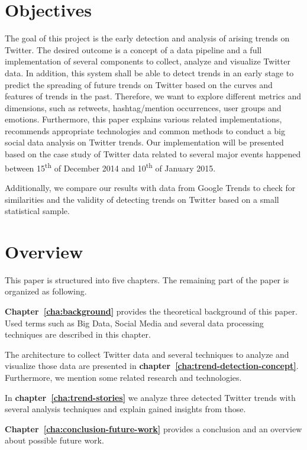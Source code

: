 \section{Objectives}
\label{sec:objectives}
The goal of this project is the early detection and analysis of arising trends on Twitter. The desired outcome is a concept of a data pipeline and a full implementation of several components to collect, analyze and visualize Twitter data. In addition, this system shall be able to detect trends in an early stage to predict the spreading of future trends on Twitter based on the curves and features of trends in the past. Therefore, we want to explore different metrics and dimensions, such as retweets, hashtag/mention occurrences, user groups and emotions. Furthermore, this paper explains various related implementations, recommends appropriate technologies and common methods to conduct a big social data analysis on Twitter trends. Our implementation will be presented based on the case study of Twitter data related to several major events happened between 15\textsuperscript{th} of December 2014 and 10\textsuperscript{th} of January 2015.

Additionally, we compare our results with data from Google Trends to check for similarities and the validity of detecting trends on Twitter based on a small statistical sample.

\clearpage
\section{Overview}
\label{sec:overview}
This paper is structured into five chapters. The remaining part of the paper is organized as following.

\textbf{Chapter~\ref{cha:background}} provides the theoretical background of this paper. Used terms such as Big Data, Social Media and several data processing techniques are described in this chapter.

The architecture to collect Twitter data and several techniques to analyze and visualize those data are presented in \textbf{chapter~\ref{cha:trend-detection-concept}}. Furthermore, we mention some related research and technologies.

In \textbf{chapter~\ref{cha:trend-stories}} we analyze three detected Twitter trends with several analysis techniques and explain gained insights from those.

\textbf{Chapter~\ref{cha:conclusion-future-work}} provides a conclusion and an overview about possible future work.
